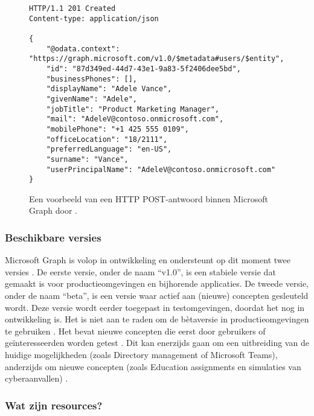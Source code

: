 \begin{figure}[h]
    \scriptsize
    \begin{verbatim}
HTTP/1.1 201 Created
Content-type: application/json

{
    "@odata.context": "https://graph.microsoft.com/v1.0/$metadata#users/$entity",
    "id": "87d349ed-44d7-43e1-9a83-5f2406dee5bd",
    "businessPhones": [],
    "displayName": "Adele Vance",
    "givenName": "Adele",
    "jobTitle": "Product Marketing Manager",
    "mail": "AdeleV@contoso.onmicrosoft.com",
    "mobilePhone": "+1 425 555 0109",
    "officeLocation": "18/2111",
    "preferredLanguage": "en-US",
    "surname": "Vance",
    "userPrincipalName": "AdeleV@contoso.onmicrosoft.com"
}
    \end{verbatim}    
    \caption[Voorbeeld Microsoft Graph POST-antwoord]{Een voorbeeld van een \ac{HTTP} POST-antwoord binnen Microsoft Graph door \textcite{Microsoft2022e}.}
    \label{MSPRES}
\end{figure}

\subsubsection{Beschikbare versies}


Microsoft Graph is volop in ontwikkeling en ondersteunt op dit moment twee versies \Autocite{Microsoft2023f}. De eerste versie, onder de naam “v1.0”, is een stabiele versie dat gemaakt is voor productieomgevingen en bijhorende applicaties. De tweede versie, onder de naam “beta”, is een versie waar actief aan (nieuwe) concepten gesleuteld wordt. Deze versie wordt eerder toegepast in testomgevingen, doordat het nog in ontwikkeling is. Het is niet aan te raden om de bètaversie in productieomgevingen te gebruiken \autocite{Microsoft2023vv}. Het bevat nieuwe concepten die eerst door gebruikers of geïnteresseerden worden getest \autocite{Microsoft2022e}. Dit kan enerzijds gaan om een uitbreiding van de huidige mogelijkheden (zoals Directory management of Microsoft Teams), anderzijds om nieuwe concepten (zoals Education assignments en simulaties van cyberaanvallen) \autocite{Microsoft2023w}.

\subsubsection{Wat zijn resources?}


